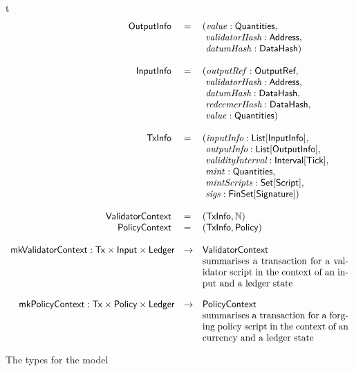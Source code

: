 %
\begin{ruledfigure}{t}
  \begin{displaymath}
  \begin{array}{rll}
    \s{OutputInfo}\s{ } &=&(\val: \Quantities,\\
                          & &\ \i{validatorHash}: \Address,\\
                          & &\ \datumHash: \DataHash)\\
    \\
    \s{InputInfo}\s{ } &=& (\outputref: \s{OutputRef},\\
                         & &\ \i{validatorHash}: \Address,\\
                         & &\ \i{datumHash}: \DataHash,\\
                         & &\ \i{redeemerHash}: \DataHash,\\
                         & &\ \val: \Quantities)\\
     \\
     \s{TxInfo}\s{ } &=&(\i{inputInfo}: \List{\s{InputInfo}},\\
                 & &\ \i{outputInfo}: \List{\s{OutputInfo}},\\
                 & &\ \i{validityInterval}: \Interval{\Tick},\\
                 & &\ \mint: \Quantities,\\
                 & &\ \mintScripts: \Set{\Script},\\
                 & &\ \sigs: \FinSet{\Signature})\\
    \\
    \s{\vlctx}\s{ } &=& (\s{TxInfo}, \N) \\
    \s{\mpsctx}\s{ } &=& (\s{TxInfo}, \Policy) \\
    \\
    \mkVlContext: \eutxotx \times \s{Input} \times \Ledger & \rightarrow &\vlctx\\
                     & &   \mbox{\parbox[t]{55mm}{summarises a transaction for a validator script in the context of an input and a ledger state}}\\
 \\
    \mkMpsContext: \eutxotx \times \Policy \times \Ledger & \rightarrow & \mpsctx\\
                     & &   \mbox{\parbox[t]{55mm}{summarises a transaction for a forging policy script in the context of an currency and a ledger state}}\\
  \end{array}
  \end{displaymath}
  \caption{The \ctx{} types for the \EUTXOma{} model}
  \label{fig:ctx-types}
\end{ruledfigure}

